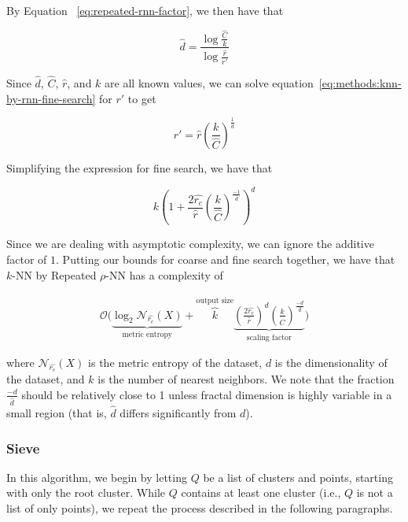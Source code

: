 By Equation ~\ref{eq:repeated-rnn-factor}, we then have that

\begin{equation*}
    \hat{d} = \frac{\log{}\frac{\hat{C}}{k}}{\log{}\frac{\hat{r}}{r'}}
\end{equation*}

Since $\hat{d}$, $\hat{C}$, $\hat{r}$, and $k$ are all known values, we can solve equation~\ref{eq:methods:knn-by-rnn-fine-search} for $r'$ to get

\begin{equation*}
    r' = \hat{r}\left(\frac{k}{\hat{C}}\right)^{\frac{1}{\hat{d}}}
\end{equation*}

Simplifying the expression for fine search, we have that

\begin{equation*}
    k\left(1+ \frac{2\hat{r_c}}{\hat{r}}\left(\frac{k}{\hat{C}}\right)^{\frac{-1}{\hat{d}}}\right)^d
\end{equation*}

Since we are dealing with asymptotic complexity, we can ignore the additive factor of $1$.
Putting our bounds for coarse and fine search together, we have that $k$-NN by Repeated $\rho$-NN has a complexity of



\begin{gather}
    \mathcal{O}\Bigg(
    \underbrace{\log_2{\mathcal{N}_{\hat{r_c}}(X)}}_{\textrm{metric entropy}} + 
    \overbrace{k}^{\textrm{output size}}
    \underbrace{\left(\frac{2\hat{r_c}}{\hat{r}}\right)^d\left(\frac{k}{\hat{C}}\right)^{\frac{-d}{\hat{d}}}}_{\textrm{scaling factor}}\Bigg)
    \label{eq:methods:knn-by-rnn-complexity}
\end{gather}

where $\mathcal{N}_{\hat{r_c}}(X)$ is the metric entropy of the dataset, $d$ is the dimensionality of the dataset, and $k$ is the number of nearest neighbors.
We note that the fraction $\frac{-d}{\hat{d}}$ should be relatively close to 1 unless fractal dimension is highly variable in a small region (that is, $\hat{d}$ differs significantly from $d$).


\subsubsection{Sieve}
\label{subsubsec:methods:knn-search:sieve}

In this algorithm, we begin by letting $Q$ be a list of clusters and points, starting with only the root cluster. 
While $Q$ contains at least one cluster (i.e., $Q$ is not a list of only points), we repeat the process described in 
the following paragraphs. 

